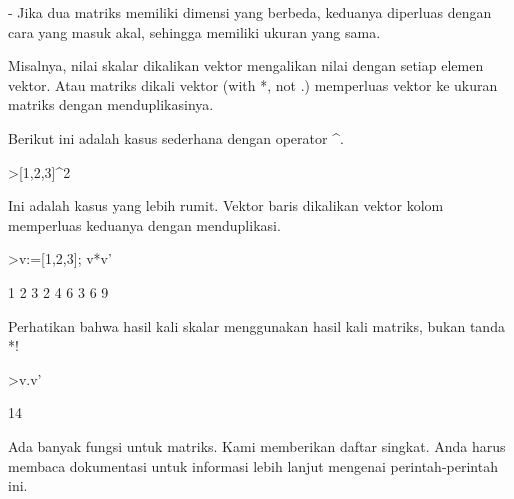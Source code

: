 \documentclass[a4paper,10pt]{article}
\begin{document}
\begin{eulernotebook}
\begin{eulercomment}
\begin{eulercomment}
\begin{eulercomment}
\begin{eulercomment}
\begin{eulercomment}
\begin{eulercomment}
\begin{eulercomment}
- Jika dua matriks memiliki dimensi yang berbeda, keduanya diperluas
dengan cara yang masuk akal, sehingga memiliki ukuran yang sama.

Misalnya, nilai skalar dikalikan vektor mengalikan nilai dengan setiap
elemen vektor. Atau matriks dikali vektor (with *, not .) memperluas
vektor ke ukuran matriks dengan menduplikasinya.

Berikut ini adalah kasus sederhana dengan operator \textasciicircum{}.
\end{eulercomment}
\begin{eulerprompt}
>[1,2,3]^2
\end{eulerprompt}
\begin{euleroutput}
  [1,  4,  9]
\end{euleroutput}
\begin{eulercomment}
Ini adalah kasus yang lebih rumit. Vektor baris dikalikan vektor kolom
memperluas keduanya dengan menduplikasi.
\end{eulercomment}
\begin{eulerprompt}
>v:=[1,2,3]; v*v'
\end{eulerprompt}
\begin{euleroutput}
              1             2             3 
              2             4             6 
              3             6             9 
\end{euleroutput}
\begin{eulercomment}
Perhatikan bahwa hasil kali skalar menggunakan hasil kali matriks,
bukan tanda *!
\end{eulercomment}
\begin{eulerprompt}
>v.v'
\end{eulerprompt}
\begin{euleroutput}
  14
\end{euleroutput}
\begin{eulercomment}
Ada banyak fungsi untuk matriks. Kami memberikan daftar singkat. Anda
harus membaca dokumentasi untuk informasi lebih lanjut mengenai
perintah-perintah ini.


\end{eulercomment}
\end{eulercomment}
\end{eulercomment}
\end{eulercomment}
\end{eulercomment}
\end{eulercomment}
\end{eulercomment}
\end{eulernotebook}
\end{document}
